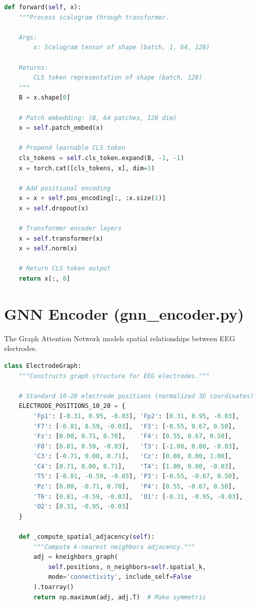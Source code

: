 \begin{lstlisting}[language=Python, caption={Transformer Encoder Forward Pass}]
def forward(self, x):
    """Process scalogram through transformer.

    Args:
        x: Scalogram tensor of shape (batch, 1, 64, 128)

    Returns:
        CLS token representation of shape (batch, 128)
    """
    B = x.shape[0]

    # Patch embedding: (B, 64 patches, 128 dim)
    x = self.patch_embed(x)

    # Prepend learnable CLS token
    cls_tokens = self.cls_token.expand(B, -1, -1)
    x = torch.cat([cls_tokens, x], dim=1)

    # Add positional encoding
    x = x + self.pos_encoding[:, :x.size(1)]
    x = self.dropout(x)

    # Transformer encoder layers
    x = self.transformer(x)
    x = self.norm(x)

    # Return CLS token output
    return x[:, 0]
\end{lstlisting}

\section{GNN Encoder (gnn\_encoder.py)}

The Graph Attention Network models spatial relationships between EEG electrodes.

\begin{lstlisting}[language=Python, caption={Electrode Graph Construction}]
class ElectrodeGraph:
    """Constructs graph structure for EEG electrodes."""

    # Standard 10-20 electrode positions (normalized 3D coordinates)
    ELECTRODE_POSITIONS_10_20 = {
        'Fp1': [-0.31, 0.95, -0.03], 'Fp2': [0.31, 0.95, -0.03],
        'F7': [-0.81, 0.59, -0.03],  'F3': [-0.55, 0.67, 0.50],
        'Fz': [0.00, 0.71, 0.70],    'F4': [0.55, 0.67, 0.50],
        'F8': [0.81, 0.59, -0.03],   'T3': [-1.00, 0.00, -0.03],
        'C3': [-0.71, 0.00, 0.71],   'Cz': [0.00, 0.00, 1.00],
        'C4': [0.71, 0.00, 0.71],    'T4': [1.00, 0.00, -0.03],
        'T5': [-0.81, -0.59, -0.03], 'P3': [-0.55, -0.67, 0.50],
        'Pz': [0.00, -0.71, 0.70],   'P4': [0.55, -0.67, 0.50],
        'T6': [0.81, -0.59, -0.03],  'O1': [-0.31, -0.95, -0.03],
        'O2': [0.31, -0.95, -0.03]
    }

    def _compute_spatial_adjacency(self):
        """Compute k-nearest neighbors adjacency."""
        adj = kneighbors_graph(
            self.positions, n_neighbors=self.spatial_k,
            mode='connectivity', include_self=False
        ).toarray()
        return np.maximum(adj, adj.T)  # Make symmetric
\end{lstlisting}

